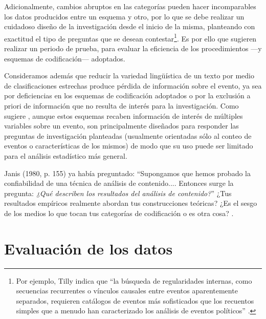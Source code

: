 \documentclass[letterpaper, 11pt]{book}
\theoremstyle{definition}
\theoremstyle{remark}
\begin{document}
Adicionalmente, cambios abruptos en las categorías pueden hacer incomparables los datos producidos entre un esquema y otro, por lo que se debe realizar un cuidadoso diseño de la investigación desde el inicio de la misma, planteando con exactitud el tipo de preguntas que se desean contestar\footnote{
    Por ejemplo, Tilly indica que ``la búsqueda de regularidades internas, como secuencias recurrentes o vínculos causales entre eventos aparentemente separados, requieren catálogos de eventos más sofisticados que los recuentos simples que a menudo han caracterizado los análisis de eventos políticos'' \citep[252]{2002_Tilly_EventCatalogsAsTheories}. 
}. 
Es por ello que \citet{2002_Koopmans_AEP} sugieren realizar un periodo de prueba, para evaluar la eficiencia de los procedimientos ---y esquemas de codificación--- adoptados. 


Consideramos además que reducir la variedad lingüística de un texto por medio de clasificaciones estrechas produce pérdida de información sobre el evento, ya sea por deficiencias en los esquemas de codificación adoptados o por la exclusión a priori de información que no resulta de interés para la investigación. 
Como sugiere \citet{2010_Franzosi_QNA}, aunque estos esquemas recaben información de interés de múltiples variables sobre un evento, son principalmente diseñados para responder las preguntas de investigación planteadas (usualmente orientadas sólo al conteo de eventos o características de los mismos) de modo que su uso puede ser limitado para el análisis estadístico más general.

\begin{center}
    \begin{minipage}{0.9\linewidth}
        {\setlength{\parindent}{12pt}\small
        Janis (1980, p. 155) ya había preguntado: ``Supongamos que hemos probado la confiabilidad de una técnica de análisis de contenido.... Entonces surge la pregunta: \emph{¿Qué describen los resultados del análisis de contenido?}'' ¿Tus resultados empíricos realmente abordan tus construcciones teóricas? ¿Es el sesgo de los medios lo que tocan tus categorías de codificación o es otra cosa? \normalsize \citep[151]{2010_Franzosi_QNA}.
        }
    \end{minipage}
\end{center}







\section{Evaluación de los datos}
\label{sec:validezLAOMS}
\end{document}
